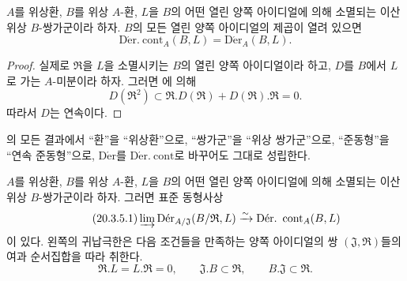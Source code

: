 \begin{proposition}[20.3.3]
\label{0.20.3.3-ko}
$A$를 위상환, $B$를 위상 $A$-환, $L$을 $B$의 어떤 열린 양쪽
아이디얼에 의해 소멸되는 이산 위상 $B$-쌍가군이라 하자. $B$의 모든
열린 양쪽 아이디얼의 제곱이 열려 있으면
\[
  \operatorname{D\acute{e}r.\ cont}_A(B,L)
  =\operatorname{D\acute{e}r}_A(B,L).
\]
\end{proposition}

\begin{proof}
실제로 $\mathfrak R$을 $L$을 소멸시키는 $B$의 열린 양쪽 아이디얼이라
하고, $D$를 $B$에서 $L$로 가는 $A$-미분이라 하자. 그러면
에 의해
\[
  D(\mathfrak R^2)\subset
  \mathfrak R.D(\mathfrak R)+D(\mathfrak R).\mathfrak R=0.
\]
따라서 $D$는 연속이다.
\end{proof}

\begin{env}[20.3.4]
\label{0.20.3.4-ko}
의 모든 결과에서 ``환''을 ``위상환''으로,
``쌍가군''을 ``위상 쌍가군''으로, ``준동형''을 ``연속 준동형''으로,
$\operatorname{D\acute{e}r}$를 $\operatorname{D\acute{e}r.\ cont}$로
바꾸어도 그대로 성립한다.
\end{env}

\begin{proposition}[20.3.5]
\label{0.20.3.5-ko}
$A$를 위상환, $B$를 위상 $A$-환, $L$을 $B$의 어떤 열린 양쪽
아이디얼에 의해 소멸되는 이산 위상 $B$-쌍가군이라 하자. 그러면
표준 동형사상
\begin{equation}
\tag{20.3.5.1}
\label{0.20.3.5.1-ko}
  \varinjlim\operatorname{D\acute{e}r}_{A/\mathfrak J}
  (B/\mathfrak R,L)\xrightarrow{\sim}
  \operatorname{D\acute{e}r.\ cont}_A(B,L)
\end{equation}
이 있다. 왼쪽의 귀납극한은 다음 조건들을 만족하는 양쪽 아이디얼의
쌍 $(\mathfrak J,\mathfrak R)$들의 여과 순서집합을 따라 취한다.
\[
  \mathfrak R.L=L.\mathfrak R=0,\qquad
  \mathfrak J.B\subset\mathfrak R,\qquad
  B.\mathfrak J\subset\mathfrak R.
\]
\end{proposition}

